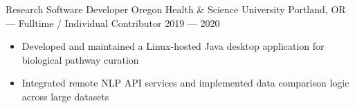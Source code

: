 \showoff
{Research Software Developer}
{Oregon Health \& Science University}
{Portland, OR --- Fulltime / Individual Contributor}
{2019 --- 2020}

\begin{itemize}
    \item Developed and maintained a Linux-hosted Java desktop application for biological pathway curation
    \item Integrated remote NLP API services and implemented data comparison logic across large datasets
\end{itemize}





\vfill \myBreak{}


